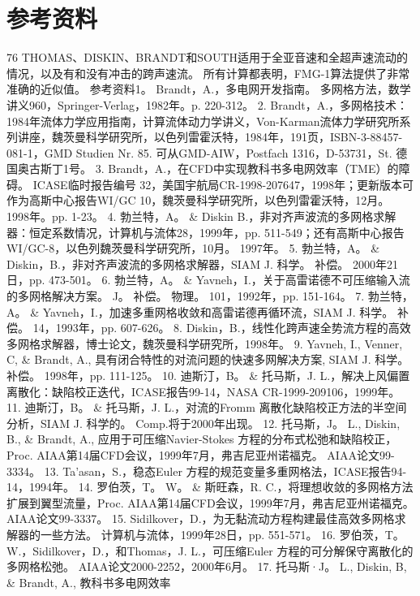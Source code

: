 \documentclass[UTF8,11pt,a4paper,openany,fontset=fandol]{ctexbook}
\begin{document}
\section{参考资料}
76 THOMAS、DISKIN、BRANDT和SOUTH适用于全亚音速和全超声速流动的情况，以及有和没有冲击的跨声速流。 所有计算都表明，FMG-1算法提供了非常准确的近似值。 参考资料1。 Brandt，A.，多电网开发指南。 多网格方法，数学讲义960，Springer-Verlag，1982年。p. 220-312。 2. Brandt，A.，多网格技术：1984年流体力学应用指南，计算流体动力学讲义，Von-Karman流体力学研究所系列讲座，魏茨曼科学研究所，以色列雷霍沃特，1984年，191页，ISBN-3-88457-081-1，GMD Studien Nr. 85. 可从GMD-AIW，Postfach 1316，D-53731，St. 德国奥古斯丁1号。 3. Brandt，A.，在CFD中实现教科书多电网效率（TME）的障碍。 ICASE临时报告编号 32，美国宇航局CR-1998-207647，1998年；更新版本可作为高斯中心报告WI/GC 10，魏茨曼科学研究所，以色列雷霍沃特，12月。 1998年。pp. 1-23。 4. 勃兰特，A。 \& Diskin B.，非对齐声波流的多网格求解器：恒定系数情况，计算机与流体28，1999年，pp. 511-549；还有高斯中心报告WI/GC-8，以色列魏茨曼科学研究所，10月。 1997年。 5. 勃兰特，A。 \& Diskin，B.，非对齐声波流的多网格求解器，SIAM J. 科学。 补偿。 2000年21日，pp. 473-501。 6. 勃兰特，A。 \& Yavneh，I.，关于高雷诺德不可压缩输入流的多网格解决方案。 J。 补偿。 物理。 101，1992年，pp. 151-164。 7. 勃兰特，A。 \& Yavneh，I.，加速多重网格收敛和高雷诺德再循环流，SIAM J. 科学。 补偿。 14，1993年，pp. 607-626。 8. Diskin，B.，线性化跨声速全势流方程的高效多网格求解器，博士论文，魏茨曼科学研究所，1998年。 9. Yavneh, I., Venner, C, \& Brandt, A., 具有闭合特性的对流问题的快速多网解决方案, SIAM J. 科学。 补偿。 1998年，pp. 111-125。 10. 迪斯汀，B。 \& 托马斯，J. L.，解决上风偏置离散化：缺陷校正迭代，ICASE报告99-14，NASA CR-1999-209106，1999年。 11. 迪斯汀，B。 \& 托马斯，J. L.，对流的Fromm 离散化缺陷校正方法的半空间分析，SIAM J. 科学的。 Comp.将于2000年出现。 12. 托马斯，J。 L., Diskin, B., \& Brandt, A., 应用于可压缩Navier-Stokes 方程的分布式松弛和缺陷校正，Proc. AIAA第14届CFD会议，1999年7月，弗吉尼亚州诺福克。 AIAA论文99-3334。 13. Ta'asan，S.，稳态Euler 方程的规范变量多重网格法，ICASE报告94-14，1994年。 14. 罗伯茨，T。 W。 \& 斯旺森，R. C.，将理想收敛的多网格方法扩展到翼型流量，Proc. AIAA第14届CFD会议，1999年7月，弗吉尼亚州诺福克。 AIAA论文99-3337。 15. Sidilkover，D.，为无黏流动方程构建最佳高效多网格求解器的一些方法。 计算机与流体，1999年28日，pp. 551-571。 16. 罗伯茨，T。 W.，Sidilkover，D.，和Thomas，J. L.，可压缩Euler 方程的可分解保守离散化的多网格松弛。 AIAA论文2000-2252，2000年6月。 17. 托马斯·J。 L., Diskin, B, \& Brandt, A., 教科书多电网效率
\end{document}
